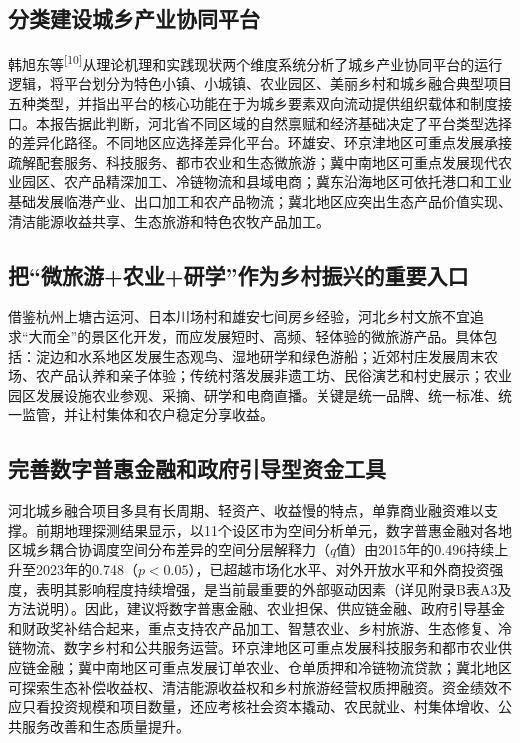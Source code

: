 \documentclass[UTF8,zihao=-4]{ctexart}
\begin{document}
\subsection{分类建设城乡产业协同平台}

韩旭东等\textsuperscript{[10]}从理论机理和实践现状两个维度系统分析了城乡产业协同平台的运行逻辑，将平台划分为特色小镇、小城镇、农业园区、美丽乡村和城乡融合典型项目五种类型，并指出平台的核心功能在于为城乡要素双向流动提供组织载体和制度接口。本报告据此判断，河北省不同区域的自然禀赋和经济基础决定了平台类型选择的差异化路径。不同地区应选择差异化平台。环雄安、环京津地区可重点发展承接疏解配套服务、科技服务、都市农业和生态微旅游；冀中南地区可重点发展现代农业园区、农产品精深加工、冷链物流和县域电商；冀东沿海地区可依托港口和工业基础发展临港产业、出口加工和农产品物流；冀北地区应突出生态产品价值实现、清洁能源收益共享、生态旅游和特色农牧产品加工。

\subsection{把“微旅游+农业+研学”作为乡村振兴的重要入口}

借鉴杭州上塘古运河、日本川场村和雄安七间房乡经验，河北乡村文旅不宜追求“大而全”的景区化开发，而应发展短时、高频、轻体验的微旅游产品。具体包括：淀边和水系地区发展生态观鸟、湿地研学和绿色游船；近郊村庄发展周末农场、农产品认养和亲子体验；传统村落发展非遗工坊、民俗演艺和村史展示；农业园区发展设施农业参观、采摘、研学和电商直播。关键是统一品牌、统一标准、统一监管，并让村集体和农户稳定分享收益。

\subsection{完善数字普惠金融和政府引导型资金工具}

河北城乡融合项目多具有长周期、轻资产、收益慢的特点，单靠商业融资难以支撑。前期地理探测结果显示，以11个设区市为空间分析单元，数字普惠金融对各地区城乡耦合协调度空间分布差异的空间分层解释力（$q$值）由2015年的0.496持续上升至2023年的0.748（$p<0.05$），已超越市场化水平、对外开放水平和外商投资强度，表明其影响程度持续增强，是当前最重要的外部驱动因素（详见附录B表A3及方法说明）。因此，建议将数字普惠金融、农业担保、供应链金融、政府引导基金和财政奖补结合起来，重点支持农产品加工、智慧农业、乡村旅游、生态修复、冷链物流、数字乡村和公共服务运营。环京津地区可重点发展科技服务和都市农业供应链金融；冀中南地区可重点发展订单农业、仓单质押和冷链物流贷款；冀北地区可探索生态补偿收益权、清洁能源收益权和乡村旅游经营权质押融资。资金绩效不应只看投资规模和项目数量，还应考核社会资本撬动、农民就业、村集体增收、公共服务改善和生态质量提升。
\end{document}
